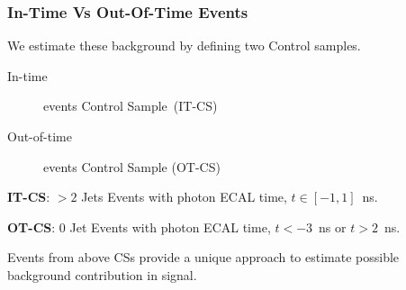 \documentclass{beamer}
\begin{document}
\begin{frame}
\frametitle{In-Time Vs Out-Of-Time Events}
We estimate these background by defining two Control samples.
\begin{flushleft}
 \begin{description}
   \item[In-time] events Control Sample~(IT-CS)
   \item[Out-of-time] events Control Sample (OT-CS)
 \end{description} 
 \end{flushleft}
\begin{tcolorbox}[colback=UNL@Cream!5,colframe=UMN@Maroon!40,title=\textcolor{UMN@Gold}{\textbf{Control Sample (In-time Events)}}]
\textbf{IT-CS}: $> 2$ Jets Events with photon ECAL time, $t \in [-1, 1]$~ns.
\end{tcolorbox}

\begin{tcolorbox}[colback=UNL@Cream!5,colframe=UMN@Maroon!40,title=\textcolor{UMN@Gold}{\textbf{Control Sample (Out-Of-time Events)}}]
\textbf{OT-CS}: $0$ Jet Events with photon ECAL time, $ t < -3$~ns or $t > 2$~ns.
\end{tcolorbox}
 
 \begin{minipage}[t]{0.8\linewidth}
 Events from above CSs provide a unique approach to estimate possible background contribution in signal.
 \end{minipage}
\end{frame}
\end{document}
